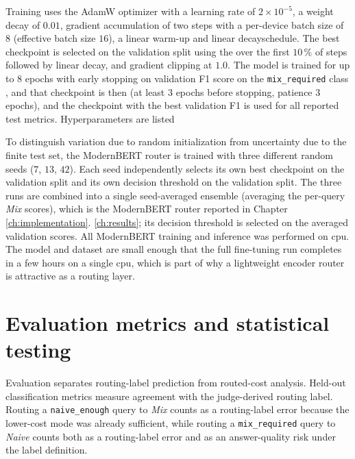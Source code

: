 \documentclass[english, bibtex]{kththesis}               %
\numberwithin{listing}{chapter}
\providecommand{\DIFaddtex}[1]{{\protect\color{blue} \sf #1}} %
\providecommand{\DIFdeltex}[1]{{\protect\color{red} \scriptsize #1}} %
\providecommand{\DIFaddbegin}{} %
\providecommand{\DIFaddend}{} %
\providecommand{\DIFdelbegin}{} %
\providecommand{\DIFdelend}{} %
\providecommand{\DIFadd}[1]{\texorpdfstring{\DIFaddtex{#1}}{#1}} %
\providecommand{\DIFdel}[1]{\texorpdfstring{\DIFdeltex{#1}}{}} %
\begin{document}
\DIFadd{Training uses the AdamW optimizer }\DIFaddend \cite{loshchilov2019decoupled} with a \DIFaddbegin \DIFadd{learning rate of $2 \times 10^{-5}$, a weight decay of $0.01$, gradient accumulation of two steps with a per-device batch size of $8$ (effective batch size $16$), a }\DIFaddend linear warm-up \DIFdelbegin \DIFdel{and linear decayschedule. The best checkpoint is selected on the validation split using the }\DIFdelend \DIFaddbegin \DIFadd{over the first $10\,\%$ of steps followed by linear decay, and gradient clipping at $1.0$. The model is trained for up to $8$ epochs with early stopping on validation }\DIFaddend F1 \DIFdelbegin \DIFdel{score }\DIFdelend on the \texttt{mix\_required} class \DIFdelbegin \DIFdel{, and that checkpoint is then }\DIFdelend \DIFaddbegin \DIFadd{(at least $3$ epochs before stopping, patience $3$ epochs), and the checkpoint with the best validation F1 is }\DIFaddend used for all reported test metrics.
\DIFdelbegin \DIFdel{Hyperparameters are listed }\DIFdelend \DIFaddbegin 

\DIFadd{To distinguish variation due to random initialization from uncertainty due to the finite test set, the ModernBERT router is trained with three different random seeds ($7$, $13$, $42$). Each seed independently selects its own best checkpoint on the validation split and its own decision threshold on the validation split. The three runs are combined into a single seed-averaged ensemble (averaging the per-query \emph{Mix} scores), which is the ModernBERT router reported }\DIFaddend in Chapter~\DIFdelbegin \DIFdel{\ref{ch:implementation}. }\DIFdelend \DIFaddbegin \DIFadd{\ref{ch:results}; its decision threshold is selected on the averaged validation scores. All ModernBERT training and inference was performed on \gls{cpu}. The model and dataset are small enough that the full fine-tuning run completes in a few hours on a single \gls{cpu}, which is part of why a lightweight encoder router is attractive as a routing layer.
}\DIFaddend 

\DIFdelbegin %
\DIFdelend \DIFaddbegin \section{Evaluation metrics and statistical testing}
\DIFaddend \label{sec:methodEvaluation}

Evaluation separates routing-label prediction from routed-cost analysis. Held-out classification metrics measure agreement with the judge-derived routing label. Routing a \texttt{naive\_enough} query to \emph{Mix} counts as a routing-label error because the lower-cost mode was already sufficient, while routing a \texttt{mix\_required} query to \emph{Naive} counts both as a routing-label error and as an answer-quality risk under the label definition.
\end{document}
